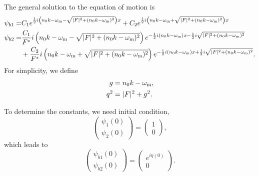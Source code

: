 The general solution to the equation of motion is
\begin{align}
   \psi_{b1} = & C_1 e^{\frac{1}{2} i \left( n_0 k -\omega_\mathrm m - \sqrt{  \lvert F \rvert^2 +  (n_0 k -\omega_\mathrm m)^2 } \right)x} + C_2 e^{\frac{1}{2} i \left( n_0 k -\omega_\mathrm m + \sqrt{  \lvert F \rvert^2 +  (n_0 k -\omega_\mathrm m)^2 } \right)x} \\
   \psi_{b2} = & \frac{C_1}{F^*} i \left( n_0 k - \omega_\mathrm m - \sqrt{ \lvert F\rvert^2 + ( n_0 k - \omega_\mathrm m )^2 } \right) e^{ -\frac{1}{2}i (n_0 k - \omega_\mathrm m ) x - \frac{1}{2} i \sqrt{ \lvert F \rvert^2 + (n_0 k - \omega_\mathrm m )^2 }  } \nonumber\\
   & + \frac{C_2}{F^*} i \left( n_0 k - \omega_\mathrm m + \sqrt{ \lvert F\rvert^2 + ( n_0 k - \omega_\mathrm m )^2 }  \right)   e^{ -\frac{1}{2}i (n_0 k - \omega_\mathrm m ) x + \frac{1}{2} i \sqrt{ \lvert F \rvert^2 + (n_0 k - \omega_\mathrm m )^2 }  } .
\end{align}
For simplicity, we define
\begin{align}
   g &= n_0 k  - \omega_\mm, \\
   q^2 &= \lvert F \rvert^2 + g^2.
   \label{chap:matter-sec:deep-jacobi-subsec:single-matter-freq-eqn:definition-g-q}
\end{align}

To determine the constants, we need initial condition,
\begin{equation}
   \begin{pmatrix} \psi_1 (0) \\ \psi_2(0)  \end{pmatrix} = \begin{pmatrix} 1 \\ 0  \end{pmatrix} ,
\end{equation}
which leads to
\begin{equation}
   \begin{pmatrix} \psi_{b1} (0) \\ \psi_{b2}(0)  \end{pmatrix} = \begin{pmatrix} e^{i\eta(0)} \\ 0  \end{pmatrix}.
\end{equation}

